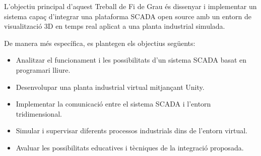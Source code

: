 \documentclass[12pt,a4paper]{report}
\begin{document}
L'objectiu principal d'aquest Treball de Fi de Grau és dissenyar i implementar un sistema capaç d'integrar una plataforma SCADA open source amb un entorn de visualització 3D en temps real aplicat a una planta industrial simulada.

De manera més específica, es plantegen els objectius següents:

\begin{itemize}
    \item Analitzar el funcionament i les possibilitats d'un sistema SCADA basat en programari lliure.
    
    \item Desenvolupar una planta industrial virtual mitjançant Unity.
    
    \item Implementar la comunicació entre el sistema SCADA i l'entorn tridimensional.
    
    \item Simular i supervisar diferents processos industrials dins de l'entorn virtual.
    
    \item Avaluar les possibilitats educatives i tècniques de la integració proposada.
\end{itemize}

\nocite{*}
\printbibliography
\end{document}
